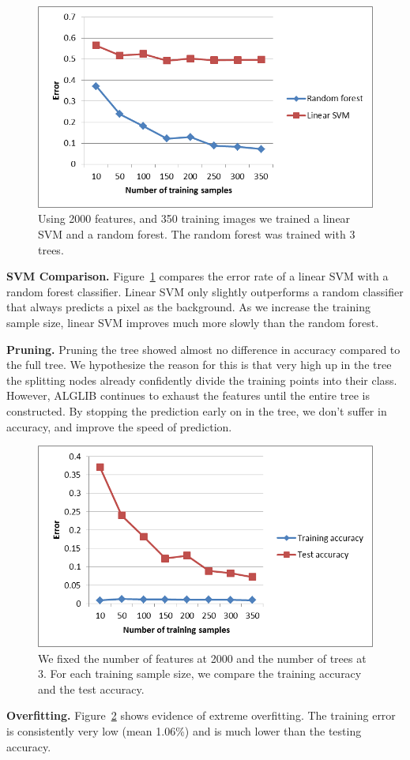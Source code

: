 \begin{figure}
\begin{center}
\includegraphics[width=0.45 \textwidth]{fig/linearsvm.png}
\end{center}
\caption{Using 2000 features, and 350 training images we trained a linear SVM and a random forest. The random forest was trained with 3 trees.}
\label{fig:linearsvm}
\end{figure}


\textbf{SVM Comparison.} Figure~\ref{fig:linearsvm} compares the error rate of a linear SVM with a random forest classifier. Linear SVM only slightly outperforms a random classifier that always predicts a pixel as the background. As we increase the training sample size, linear SVM improves much more slowly than the random forest.

\textbf{Pruning.} Pruning the tree showed almost no difference in accuracy compared to the full tree. We hypothesize the reason for this is that very high up in the tree the splitting nodes already confidently divide the training points into their class. However, ALGLIB continues to exhaust the features until the entire tree is constructed. By stopping the prediction early on in the tree, we don't suffer in accuracy, and improve the speed of prediction.

\begin{figure}
\begin{center}
\includegraphics[width=0.45 \textwidth]{fig/trainingacc.png}
\end{center}
\caption{We fixed the number of features at 2000 and the number of trees at 3. For each training sample size, we compare the training accuracy and the test accuracy.}
\label{fig:trainingacc}
\end{figure}

\textbf{Overfitting.} Figure~\ref{fig:trainingacc} shows evidence of extreme overfitting. The training error is consistently very low (mean 1.06\%) and is much lower than the testing accuracy. 
